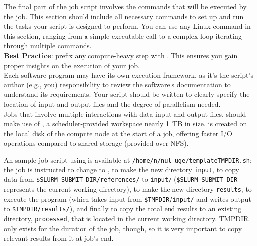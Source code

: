 
The final part of the job script involves the commands that will be executed by the job.
This section should include all necessary commands to set up and run the tasks 
your script is designed to perform. You can use any Linux command in this section, 
ranging from a simple executable call to a complex loop iterating through multiple commands.\\

\noindent \textbf{Best Practice}: prefix any compute-heavy step with .
This ensures you gain proper insights on the execution of your job.\\

\noindent Each software program may have its own execution framework, as it's the script's author (e.g., you) 
responsibility to review the software's documentation to understand its requirements.
Your script should be written to clearly specify the location of input and output files and the degree of parallelism needed.\\

%

\noindent Jobs that involve multiple interactions with data input and output files, should make use of , 
a scheduler-provided workspace nearly 1~TB in size.
 is created on the local disk of the compute node at the start of a job, offering faster I/O operations 
compared to shared storage (provided over NFS).

An sample job script using  is available at \texttt{/home/n/nul-uge/templateTMPDIR.sh}: 
the job is instructed to change to , to make the new directory \texttt{input}, to copy data from
\texttt{\$SLURM\_SUBMIT\_DIR/references/} to \texttt{input/} (\texttt{\$SLURM\_SUBMIT\_DIR} represents the
current working directory), to make the new directory \texttt{results}, to
execute the program (which takes input from \texttt{\$TMPDIR/input/} and writes
output to \texttt{\$TMPDIR/results/}), and finally to copy the total end results
to an existing directory, \texttt{processed}, that is located in the current
working directory.
TMPDIR only exists for the duration of the job, though,
so it is very important to copy relevant results from it at job's end.

